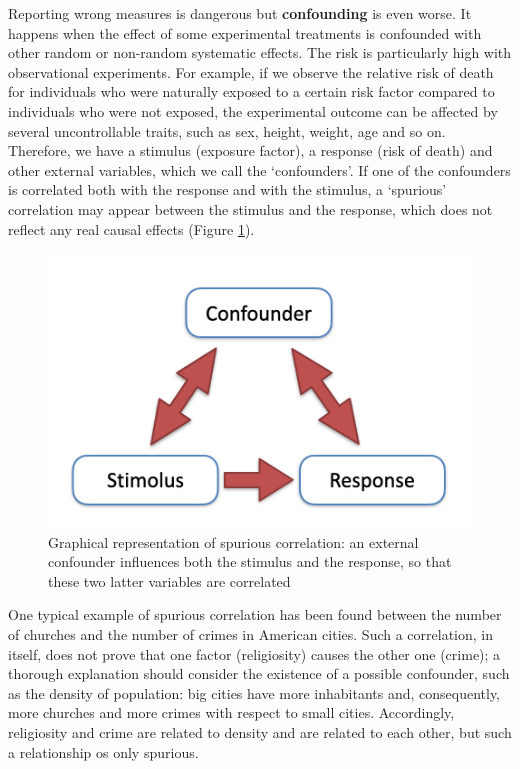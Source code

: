 \documentclass[a4paper,12pt,oneside]{book}
\begin{document}
Reporting wrong measures is dangerous but \textbf{confounding} is even worse. It happens when the effect of some experimental treatments is confounded with other random or non-random systematic effects. The risk is particularly high with observational experiments. For example, if we observe the relative risk of death for individuals who were naturally exposed to a certain risk factor compared to individuals who were not exposed, the experimental outcome can be affected by several uncontrollable traits, such as sex, height, weight, age and so on. Therefore, we have a stimulus (exposure factor), a response (risk of death) and other external variables, which we call the `confounders'. If one of the confounders is correlated both with the response and with the stimulus, a `spurious' correlation may appear between the stimulus and the response, which does not reflect any real causal effects (Figure \ref{fig:figName2d}).

\begin{figure}

{\centering \includegraphics[width=0.75\linewidth]{_images/Confounding} 

}

\caption{Graphical representation of spurious correlation: an external confounder influences both the stimulus and the response, so that these two latter variables are correlated}\label{fig:figName2d}
\end{figure}

One typical example of spurious correlation has been found between the number of churches and the number of crimes in American cities. Such a correlation, in itself, does not prove that one factor (religiosity) causes the other one (crime); a thorough explanation should consider the existence of a possible confounder, such as the density of population: big cities have more inhabitants and, consequently, more churches and more crimes with respect to small cities. Accordingly, religiosity and crime are related to density and are related to each other, but such a relationship os only spurious.
\end{document}
